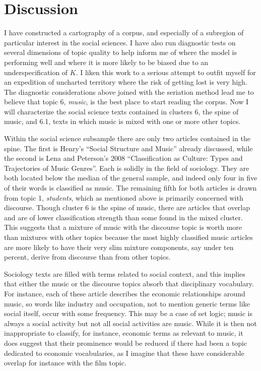 \documentclass[]{book}
\theoremstyle{definition}
\theoremstyle{definition}
\theoremstyle{definition}
\theoremstyle{remark}
\begin{document}
\hypertarget{discussion-1}{%
\section{Discussion}\label{discussion-1}}

I have constructed a cartography of a corpus, and especially of a
subregion of particular interest in the social sciences. I have also run
diagnostic tests on several dimensions of topic quality to help inform
me of where the model is performing well and where it is more likely to
be biased due to an underspecification of \(K\). I liken this work to a
serious attempt to outfit myself for an expedition of uncharted
territory where the risk of getting lost is very high. The diagnostic
considerations above joined with the seriation method lead me to believe
that topic 6, \emph{music}, is the best place to start reading the
corpus. Now I will characterize the social science texts contained in
clusters 6, the spine of music, and 6.1, texts in which music is mixed
with one or more other topics.

Within the social science subsample there are only two articles
contained in the spine. The first is Henry's ``Social Structure and
Music'' already discussed, while the second is Lena and Peterson's 2008
``Classification as Culture: Types and Trajectories of Music Genres''.
Each is solidly in the field of sociology. They are both located below
the median of the general sample, and indeed only four in five of their
words is classified as music. The remaining fifth for both articles is
drawn from topic 1, \emph{students}, which as mentioned above is
primarily concerned with discourse. Though cluster 6 is the spine of
music, there are articles that overlap and are of lower classification
strength than some found in the mixed cluster. This suggests that a
mixture of music with the discourse topic is worth more than mixtures
with other topics because the most highly classified music articles are
more likely to have their very slim mixture components, say under ten
percent, derive from discourse than from other topics.

Sociology texts are filled with terms related to social context, and
this implies that either the music or the discourse topics absorb that
disciplinary vocabulary. For instance, each of these article describes
the economic relationships around music, so words like industry and
occupation, not to mention generic terms like social itself, occur with
some frequency. This may be a case of set logic; music is always a
social activity but not all social activities are music. While it is
then not inappropriate to classify, for instance, economic terms as
relevant to music, it does suggest that their prominence would be
reduced if there had been a topic dedicated to economic vocabularies, as
I imagine that these have considerable overlap for instance with the
film topic.
\end{document}

